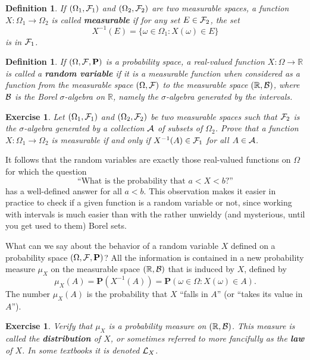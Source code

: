 \documentclass[12pt]{article}
\newtheorem{defi}[thm]{Definition}
\newtheorem{exercise}[thm]{Exercise}
\newcommand{\R}{\mathbb{R}}
\newcommand{\prob}{\mathbf{P}}
\theoremstyle{example}
\begin{document}
\begin{defi} If $(\Omega_1, {\cal F}_1)$ and $(\Omega_2, {\cal F}_2)$ are two measurable spaces, a function $X:\Omega_1\to \Omega_2$ is called \textbf{measurable} if for any set $E \in {\cal F}_2$, the set
$$ X^{-1}(E) = \{ \omega \in \Omega_1 : X(\omega) \in E \} $$
is in ${\cal F}_1$.
\end{defi}

\begin{defi} If $(\Omega, {\cal F}, \prob)$ is a probability space, a real-valued function $X:\Omega \to \R$ is called a \textbf{random variable} if it is a measurable function when considered as a function from the measurable space $(\Omega, {\cal F})$ to the measurable space $(\R, {\cal B})$, where ${\cal B}$ is the Borel $\sigma$-algebra on $\R$, namely the $\sigma$-algebra generated by the intervals.
\end{defi}

\begin{exercise} Let $(\Omega_1, {\cal F}_1)$ and $(\Omega_2, {\cal F}_2)$ be two measurable spaces such that ${\cal F}_2$ is the $\sigma$-algebra generated by a collection ${\cal A}$ of subsets of $\Omega_2$. Prove that a function $X:\Omega_1 \to \Omega_2$ is measurable
if and only if $X^{-1}(A) \in {\cal F}_1$ for all $A \in {\cal A}$.
\label{ex-checkrv}
\end{exercise}

It follows that the random variables are exactly those real-valued functions on $\Omega$ for which the question
$$ \textrm{``What is the probability that $a < X < b$?''} $$
has a well-defined answer for all $a<b$. This observation makes it easier in practice to check if a given function is a random variable or not, since working with intervals is much easier than with the rather unwieldy (and mysterious, until you get used to them) Borel sets.

\bigskip
What can we say about the behavior of a random variable $X$ defined on a probability space $(\Omega, {\cal F}, \prob)$? All the information is contained in a new probability measure $\mu_X$ on the measurable space $(\R, {\cal B})$ that is induced by $X$, defined by
$$ \mu_X(A) = \prob(X^{-1}(A)) = \prob(\omega \in \Omega : X(\omega) \in A). $$
The number $\mu_X(A)$ is the probability that $X$ ``falls in $A$'' (or ``takes its value in $A$'').

\begin{exercise} Verify that $\mu_X$ is a probability measure on $(\R, {\cal B})$. This measure is called the \textbf{distribution} of $X$, or sometimes referred to more fancifully as the \textbf{law} of $X$. In some textbooks it is denoted ${\cal L}_X$.
\end{exercise}
\end{document}
